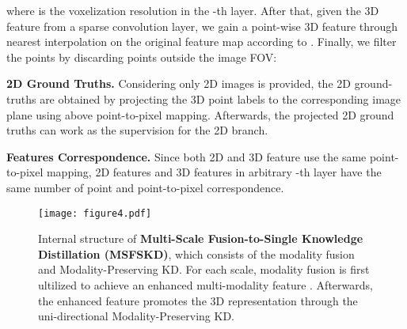 \documentclass[runningheads]{llncs}
\begin{document}
	where  is the voxelization resolution in the -th layer.
After that, given the 3D feature  from a sparse convolution layer, we gain a point-wise 3D feature  through nearest interpolation on the original feature map  according to .
Finally, we filter the points by discarding points outside the image FOV:
	
	
	
	
	\noindent\textbf{2D Ground Truths.} Considering only 2D images is provided, the 2D ground-truths are obtained by projecting the 3D point labels to the corresponding image plane using above point-to-pixel mapping.
Afterwards, the projected 2D ground truths can work as the supervision for the 2D branch. 

	
	\noindent\textbf{Features Correspondence.}
	Since both 2D and 3D feature use the same point-to-pixel mapping, 2D features  and 3D features  in arbitrary -th layer have the same number of point  and point-to-pixel correspondence.
	
	
	\begin{figure*}[t]
		\begin{centering}
			\texttt{[image: figure4.pdf]}
			\caption{Internal structure of \textbf{Multi-Scale Fusion-to-Single Knowledge Distillation (MSFSKD)}, which consists of the modality fusion and Modality-Preserving KD. For each scale, modality fusion is first ultilized to achieve an enhanced multi-modality feature . Afterwards, the enhanced feature  promotes the 3D representation  through the uni-directional Modality-Preserving KD.
			}
			\label{fig:fig4}
		\end{centering}	
	\end{figure*}
	
	
	
	
\end{document}
